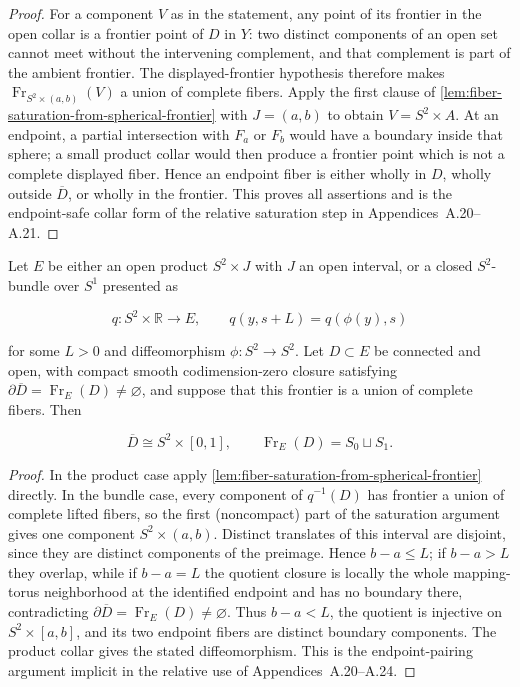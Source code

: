\begin{proof}
For a component $V$ as in the statement, any point of its frontier in the
open collar is a frontier point of $D$ in $Y$: two distinct components of an
open set cannot meet without the intervening complement, and that complement
is part of the ambient frontier.  The displayed-frontier hypothesis therefore
makes $\operatorname{Fr}_{S^2\times(a,b)}(V)$ a union of complete fibers.
Apply the first clause of
\ref{lem:fiber-saturation-from-spherical-frontier} with
$J=(a,b)$ to obtain $V=S^2\times A$.  At an endpoint, a partial intersection
with $F_a$ or $F_b$ would have a boundary inside that sphere; a small product
collar would then produce a frontier point which is not a complete displayed
fiber.  Hence an endpoint fiber is either wholly in $D$, wholly outside
$\overline D$, or wholly in the frontier.  This proves all assertions and is
the endpoint-safe collar form of the relative saturation step in
Appendices~A.20--A.21.
\end{proof}

\begin{lemma}
\label{lem:relative-fiber-boundary-pairing}
\notready
Let $E$ be either an open product $S^2\times J$ with $J$ an open interval,
or a closed $S^2$-bundle over $S^1$ presented as

\[
 q:S^2\times\mathbb R\longrightarrow E,
 \qquad q(y,s+L)=q(\phi(y),s)
\]

for some $L>0$ and diffeomorphism $\phi:S^2\to S^2$.  Let $D\subset E$ be
connected and open, with compact smooth codimension-zero closure satisfying
\(\partial\overline D=\operatorname{Fr}_E(D)\ne\varnothing\), and suppose
that this frontier is a union of complete fibers.  Then

\[
 \overline D\cong S^2\times[0,1],
 \qquad \operatorname{Fr}_E(D)=S_0\sqcup S_1.
\]
\end{lemma}

\begin{proof}
In the product case apply
\ref{lem:fiber-saturation-from-spherical-frontier} directly.  In the bundle
case, every component of $q^{-1}(D)$ has frontier a union of complete lifted
fibers, so the first (noncompact) part of the saturation argument gives one
component $S^2\times(a,b)$.  Distinct translates of this interval are
disjoint, since they are distinct components of the preimage.  Hence
$b-a\le L$; if $b-a>L$ they overlap, while if $b-a=L$ the quotient closure is
locally the whole mapping-torus neighborhood at the identified endpoint and
has no boundary there, contradicting
\(\partial\overline D=\operatorname{Fr}_E(D)\ne\varnothing\).  Thus
$b-a<L$, the quotient is injective on $S^2\times[a,b]$, and its two endpoint
fibers are distinct boundary components.  The product collar gives the stated
diffeomorphism.  This is the endpoint-pairing argument implicit in the
relative use of Appendices~A.20--A.24.
\end{proof}

